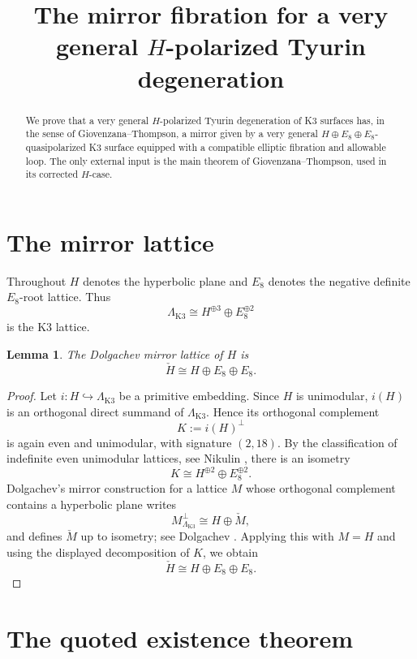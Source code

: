 \documentclass[11pt]{article}
\title{The mirror fibration for a very general \(H\)-polarized Tyurin degeneration}
\author{}
\date{}
\newtheorem{lemma}[theorem]{Lemma}
\theoremstyle{remark}
\newcommand{\Kthree}{\Lambda_{\mathrm{K3}}}
\begin{document}
\maketitle

\begin{abstract}
We prove that a very general \(H\)-polarized Tyurin degeneration of K3 surfaces has, in the sense of Giovenzana--Thompson, a mirror given by a very general \(H\oplus E_8\oplus E_8\)-quasipolarized K3 surface equipped with a compatible elliptic fibration and allowable loop. The only external input is the main theorem of Giovenzana--Thompson, used in its corrected \(H\)-case.
\end{abstract}

\section{The mirror lattice}

Throughout \(H\) denotes the hyperbolic plane and \(E_8\) denotes the negative definite \(E_8\)-root lattice. Thus
\[
\Kthree \cong H^{\oplus 3}\oplus E_8^{\oplus 2}
\]
is the K3 lattice.

\begin{lemma}\label{lem:mirror-lattice}
The Dolgachev mirror lattice of \(H\) is
\[
\check H \cong H\oplus E_8\oplus E_8 .
\]
\end{lemma}

\begin{proof}
Let \(i\colon H\hookrightarrow \Kthree\) be a primitive embedding. Since \(H\) is unimodular, \(i(H)\) is an orthogonal direct summand of \(\Kthree\). Hence its orthogonal complement
\[
K:=i(H)^\perp
\]
is again even and unimodular, with signature \((2,18)\). By the classification of indefinite even unimodular lattices, see Nikulin \cite[\S 1]{Nikulin80}, there is an isometry
\[
K \cong H^{\oplus 2}\oplus E_8^{\oplus 2}.
\]
Dolgachev's mirror construction for a lattice \(M\) whose orthogonal complement contains a hyperbolic plane writes
\[
M^\perp_{\Kthree}\cong H\oplus \check M,
\]
and defines \(\check M\) up to isometry; see Dolgachev \cite[\S 6]{Dolgachev96}. Applying this with \(M=H\) and using the displayed decomposition of \(K\), we obtain
\[
\check H\cong H\oplus E_8\oplus E_8 .
\]
\end{proof}

\section{The quoted existence theorem}
\end{document}
